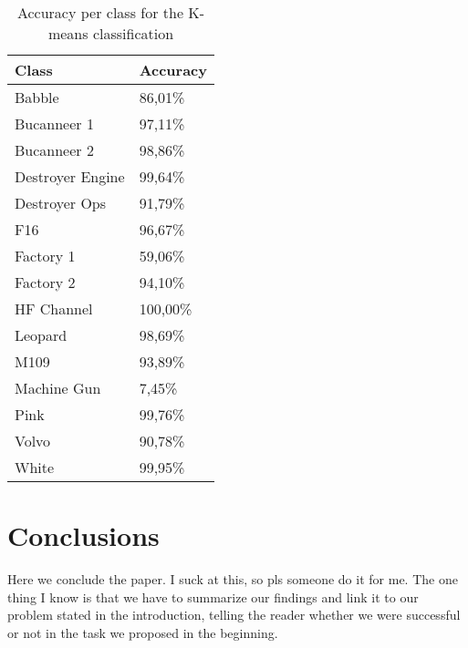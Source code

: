 \documentclass[12pt]{article}
\begin{document}
\begin{table}[h]
\centering
\caption{Accuracy per class for the K-means classification}
\label{tab:acckmeans}
\begin{tabular}{ll}
\hline
Class & Accuracy \\
\hline
Babble & 86,01\%\\
Bucanneer 1 & 97,11\%\\
Bucanneer 2 & 98,86\%\\
Destroyer Engine & 99,64\% \\
Destroyer Ops & 91,79\%\\
F16 & 96,67\%\\
Factory 1 & 59,06\%\\
Factory 2 & 94,10\%\\
HF Channel & 100,00\%\\
Leopard & 98,69\% \\
M109 & 93,89\%\\
Machine Gun & 7,45\%\\
Pink & 99,76\%\\
Volvo & 90,78\%\\
White & 99,95\%\\
\hline
\end{tabular}
\end{table}

\section{Conclusions} \label{conc}

Here we conclude the paper. I suck at this, so pls someone do it for me. The one thing I know is that we have to summarize our findings and link it to our problem stated in the introduction, telling the reader whether we were successful or not in the task we proposed in the beginning.











\end{document}
